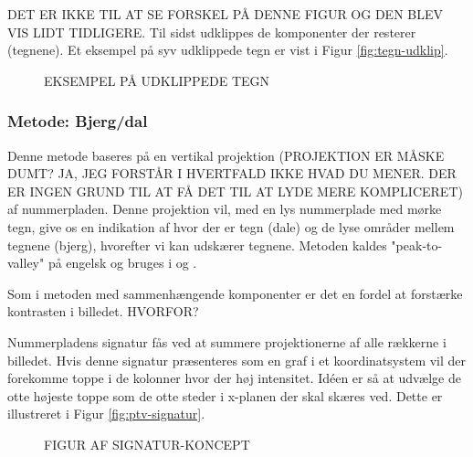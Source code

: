 DET ER IKKE TIL AT SE FORSKEL PÅ DENNE FIGUR OG DEN BLEV VIS LIDT TIDLIGERE.
Til sidst udklippes de komponenter der resterer (tegnene). Et eksempel på syv udklippede tegn er vist i Figur \vref{fig:tegn-udklip}.

\begin{figure}[htp]
  \centering
  \caption{EKSEMPEL PÅ UDKLIPPEDE TEGN}
  \label{fig:tegn-udklip}
\end{figure}

\subsubsection*{Metode: Bjerg/dal}
Denne metode baseres på en vertikal projektion (PROJEKTION ER MÅSKE DUMT? JA, JEG FORSTÅR I HVERTFALD IKKE HVAD DU MENER. DER ER INGEN GRUND TIL AT FÅ DET TIL AT LYDE MERE KOMPLICERET) af nummerpladen. Denne projektion vil, med en lys nummerplade med mørke tegn, give os en indikation af hvor der er tegn (dale) og de lyse områder mellem tegnene (bjerg), hvorefter vi kan udskærer tegnene. Metoden kaldes "peak-to-valley" på engelsk og bruges i \cite{ron} og \cite{kwas}.

Som i metoden med sammenhængende komponenter er det en fordel at forstærke kontrasten i billedet. HVORFOR?

Nummerpladens signatur fås ved at summere projektionerne af alle rækkerne i billedet. Hvis denne signatur præsenteres som en graf i et koordinatsystem vil der forekomme toppe i de kolonner hvor der høj intensitet. Idéen er så at udvælge de otte højeste toppe som de otte steder i x-planen der skal skæres ved. Dette er illustreret i Figur \vref{fig:ptv-signatur}.

\begin{figure}[htp]
  \centering
  \caption{FIGUR AF SIGNATUR-KONCEPT}
  \label{fig:ptv-signatur}
\end{figure}

